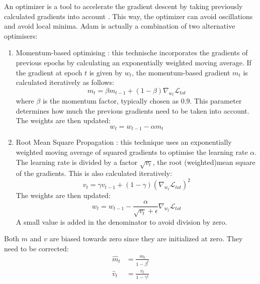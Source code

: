 \documentclass[we,twoside,openright,a4paper,11pt]{uantwerpenbamathesis}
\begin{document}
An optimizer is a tool to accelerate the gradient descent by taking previously calculated gradients into account \cite{geeksforgeeks2025adam}. This way, the optimizer can avoid oscillations and avoid local minima. Adam is actually a combination of two alternative optimisers:
\begin{enumerate}
    \item Momentum-based optimising \cite{geeksforgeeks2025momentum}: this technische incorporates the gradients of previous epochs by calculating an exponentially weighted moving average. If the gradient at epoch $t$ is given by $w_t$, the momentum-based gradient $m_t$ is calculated iteratively as follows:
    \begin{equation}
        m_t=\beta m_{t-1} + (1-\beta)\nabla_{w_t}\mathcal{L}_{tot}
    \end{equation}
    where $\beta$ is the momentum factor, typically chosen as 0.9. This parameter determines how much the previous gradients need to be taken into account. The weights are then updated:
    \begin{equation}
        w_t=w_{t-1}-\alpha m_t
    \end{equation}
    \item Root Mean Square Propagation \cite{geeksforgeeks2025rmsprop}: this technique uses an exponentially weighted moving average of squared gradients to optimise the learning rate $\alpha$. The learning rate is divided by a factor $\sqrt{v_t}$, the root (weighted)mean square of the gradients. This is also calculated iteratively:
    \begin{equation}
        v_t=\gamma v_{t-1}+(1-\gamma)\left(\nabla_{w_t}\mathcal{L}_{tot}\right)^2
    \end{equation}
     The weights are then updated:
    \begin{equation}
        w_t=w_{t-1}-\frac{\alpha}{\sqrt{v_t}+\epsilon} \nabla_{w_t}\mathcal{L}_{tot}
    \end{equation}
    A small value is added in the denominator to avoid division by zero.
\end{enumerate}

Both $m$ and $v$ are biased towards zero since they are initialized at zero. They need to be corrected:
\begin{equation}
    \begin{split}
        \hat m_t&=\frac{m_t}{1-\beta^t}\\
        \hat v_t&=\frac{v_t}{1-\gamma^t}\\
    \end{split}
\end{equation}
\end{document}
